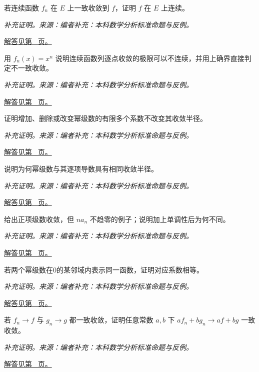 \documentclass[UTF8,12pt,a4paper,fontset=fandol]{ctexart}
\begin{document}
\begin{example}[一致极限保持连续性]\label{ex:c29q13}
若连续函数 $f_n$ 在 $E$ 上一致收敛到 $f$，证明 $f$ 在 $E$ 上连续。
\par\textit{补充证明。来源：编者补充：本科数学分析标准命题与反例。}\par\hyperref[ans:c29q13]{解答见第~\pageref{ans:c29q13} 页。}
\end{example}
\begin{example}[逐点收敛的极限可以不连续]\label{ex:c29q14}
用 $f_n(x)=x^n$ 说明连续函数列逐点收敛的极限可以不连续，并用上确界直接判定不一致收敛。
\par\textit{补充证明。来源：编者补充：本科数学分析标准命题与反例。}\par\hyperref[ans:c29q14]{解答见第~\pageref{ans:c29q14} 页。}
\end{example}
\begin{example}[幂级数半径不受有限项影响]\label{ex:c29q15}
证明增加、删除或改变幂级数的有限多个系数不改变其收敛半径。
\par\textit{补充证明。来源：编者补充：本科数学分析标准命题与反例。}\par\hyperref[ans:c29q15]{解答见第~\pageref{ans:c29q15} 页。}
\end{example}
\begin{example}[逐项求导后的半径]\label{ex:c29q16}
说明为何幂级数与其逐项导数具有相同收敛半径。
\par\textit{补充证明。来源：编者补充：本科数学分析标准命题与反例。}\par\hyperref[ans:c29q16]{解答见第~\pageref{ans:c29q16} 页。}
\end{example}
\begin{example}[正项级数与下标加权的通项]\label{ex:c29q17}
给出正项级数收敛，但 $na_n$ 不趋零的例子；说明加上单调性后为何不同。
\par\textit{补充证明。来源：编者补充：本科数学分析标准命题与反例。}\par\hyperref[ans:c29q17]{解答见第~\pageref{ans:c29q17} 页。}
\end{example}
\begin{example}[从幂级数唯一性比较系数]\label{ex:c29q18}
若两个幂级数在0的某邻域内表示同一函数，证明对应系数相等。
\par\textit{补充证明。来源：编者补充：本科数学分析标准命题与反例。}\par\hyperref[ans:c29q18]{解答见第~\pageref{ans:c29q18} 页。}
\end{example}
\begin{example}[一致收敛的线性组合]\label{ex:c29q19}
若 $f_n\to f$ 与 $g_n\to g$ 都一致收敛，证明任意常数 $a,b$ 下 $af_n+bg_n\to af+bg$ 一致收敛。
\par\textit{补充证明。来源：编者补充：本科数学分析标准命题与反例。}\par\hyperref[ans:c29q19]{解答见第~\pageref{ans:c29q19} 页。}
\end{example}
\end{document}
